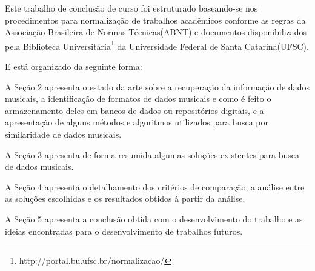 Este trabalho de conclusão de curso foi estruturado baseando-se nos procedimentos para normalização de trabalhos acadêmicos conforme as regras da Associação Brasileira de Normas Técnicas(ABNT) e documentos disponibilizados pela Biblioteca Universitária\footnote{http://portal.bu.ufsc.br/normalizacao/} da Universidade Federal de Santa Catarina(UFSC).

E está organizado da seguinte forma: 

A Seção 2 apresenta o estado da arte sobre a recuperação da informação de dados musicais, a identificação de formatos de dados musicais e como é feito o armazenamento deles em bancos de dados ou repositórios digitais, e a apresentação de alguns métodos e algoritmos utilizados para busca por similaridade de dados musicais.

A Seção 3 apresenta de forma resumida algumas soluções existentes para busca de dados musicais.

A Seção 4 apresenta o detalhamento dos critérios de comparação, a análise entre as soluções escolhidas e os resultados obtidos à partir da análise.

A Seção 5 apresenta a conclusão obtida com o desenvolvimento do trabalho e as ideias encontradas para o desenvolvimento de trabalhos futuros.